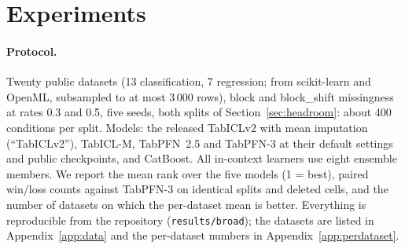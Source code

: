 \documentclass[11pt]{article}
\begin{document}
\section{Experiments}
\label{sec:experiments}

\paragraph{Protocol.} Twenty public datasets (13 classification, 7 regression; from
scikit-learn and OpenML, subsampled to at most 3\,000 rows), block and block\_shift
missingness at rates 0.3 and 0.5, five seeds, both splits of Section~\ref{sec:headroom}:
about 400 conditions per split. Models: the released TabICLv2 with mean imputation
(``TabICLv2''), TabICL-M, TabPFN~2.5 and TabPFN-3 at their default settings and public
checkpoints, and CatBoost. All in-context learners use eight ensemble members. We report
the mean rank over the five models (1 = best), paired win/loss counts against TabPFN-3
on identical splits and deleted cells, and the number of datasets on which the
per-dataset mean is better. Everything is reproducible from the repository
(\texttt{results/broad}); the datasets are listed in Appendix~\ref{app:data} and the per-dataset numbers in Appendix~\ref{app:perdataset}.
\end{document}
